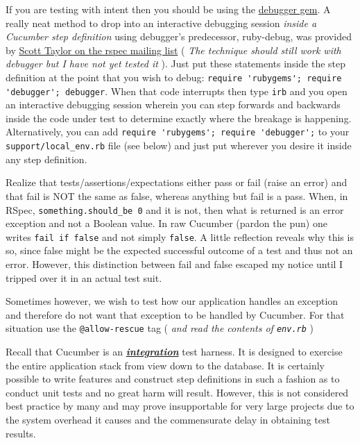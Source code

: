 If you are testing with intent then you should be using the \href{http://rubygems.org/gems/debugger/}{debugger gem}.  A really neat method to drop into an interactive debugging session \emph{inside a Cucumber step definition} using debugger's predecessor, ruby-debug, was provided by \href{http://www.ruby-forum.com/topic/175732#769713}{Scott Taylor on the rspec mailing list} ( \emph{The technique should still work with debugger but I have not yet tested it} ).  Just put these statements inside the step definition at the point that you wish to debug:  \verb+require 'rubygems'; require 'debugger'; debugger+.  When that code interrupts then type \verb+irb+ and you open an interactive debugging session wherein you can step forwards and backwards inside the code under test to determine exactly where the breakage is happening.  Alternatively, you can add \verb+require 'rubygems'; require 'debugger';+ to your \verb+support/local_env.rb+ file (see below) and just put \verb@debugger@ wherever you desire it inside any step definition.

Realize that tests/assertions/expectations either pass or fail (raise an error) and that fail is NOT the same as false, whereas anything but fail is a pass.  When, in RSpec, \verb+something.should_be 0+ and it is not, then what is returned is an error exception and not a Boolean value.  In raw Cucumber (pardon the pun) one writes \verb+fail if false+ and not simply \verb+false+.  A little reflection reveals why this is so, since false might be the expected successful outcome of a test and thus not an error.  However, this distinction between fail and false escaped my notice until I tripped over it in an actual test suit.

Sometimes however, we wish to test how our application handles an exception and therefore do not want that exception to be handled by Cucumber.  For that situation use the \verb+@allow-rescue+ tag ( \emph{and read the contents of \verb+env.rb+} )

Recall that Cucumber is an \textbf{\emph{\href{http://en.wikipedia.org/wiki/Integration_testing}{integration}}} test harness.  It is designed to exercise the entire application stack from view down to the database.  It is certainly possible to write features and construct step definitions in such a fashion as to conduct unit tests and no great harm will result.  However, this is not considered best practice by many and may prove insupportable for very large projects due to the system overhead it causes and the commensurate delay in obtaining test results.

